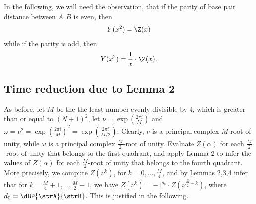 In the following, we will need the observation, that if the parity of
base pair distance \dBP{\strA}{\strB} between $A,B$ is
even, then
\begin{eqnarray}
\label{eq:evenY}
Y(x^2) = \Z(x)
\end{eqnarray}
while if the parity is odd,
then
\begin{eqnarray}
\label{eq:oddY}
Y(x^2) = \frac{1}{x} \cdot \Z(x).
\end{eqnarray}

\subsection{Time reduction due to Lemma 2}
As before, let $M$ be the the least number evenly divisible by $4$, which is
greater than or equal to $(N+1)^2$, let $\nu = \exp(\frac{2 \pi i}{M})$
and $\omega=\nu^2 = \exp(\frac{2 \pi i}{M})^2 =
\exp(\frac{2 \pi i}{M/2})$. Clearly, $\nu$ is a principal complex
$M$-root of unity, while $\omega$ is a principal complex $\frac{M}{2}$-root
of unity. Evaluate $Z(\alpha)$ for each $\frac{M}{2}$-root of unity
that belongs to the first quadrant, and apply Lemma 2 to infer the values
of $Z(\alpha)$ for each $\frac{M}{2}$-root of unity that belongs to the
fourth quadrant. More precisely,
we compute $Z(\nu^k)$, for $k=0,\ldots,\frac{M}{4}$, and by Lemmas 2,3,4 infer
that for $k=\frac{M}{4}+1,\ldots,\frac{M}{2}-1$, we have
$Z(\nu^{k})= -1^{d_0} \cdot \overline{Z(\nu^{\frac{M}{2}-k})}$, where
$d_0 = \dBP{\strA}{\strB}$. This is justified in the following.

